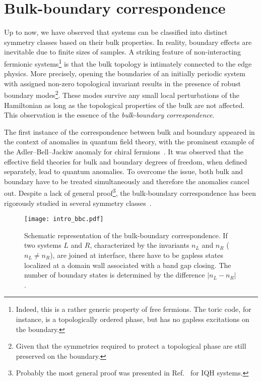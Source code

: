 \section{Bulk-boundary correspondence}
Up to now, we have observed that systems can be classified into distinct symmetry classes based on their bulk properties. In reality, boundary effects are inevitable due to finite sizes of samples. A striking feature of non-interacting fermionic systems\footnote{Indeed, this is a rather generic property of free fermions. The toric code, for instance, is a topologically ordered phase, but has no gapless excitations on the boundary.} is that the bulk topology is intimately connected to the edge physics. More precisely, opening the boundaries of an initially periodic system with assigned non-zero topological invariant results in the presence of robust boundary modes\footnote{Given that the symmetries required to protect a topological phase are still preserved on the boundary.}. These modes survive any small local perturbations of the Hamiltonian as long as the topological properties of the bulk are not affected. This observation is the essence of the \emph{bulk-boundary correspondence}.
 
The first instance of the correspondence between bulk and boundary appeared in the context of anomalies in quantum field theory, with the prominent example of the Adler–Bell–Jackiw anomaly for chiral fermions~\cite{NIELSEN1983389}. It was observed that the effective field theories for bulk and boundary degrees of freedom, when defined separately, lead to quantum anomalies. To overcome the issue, both bulk and boundary have to be treated simultaneously and therefore the anomalies cancel out. Despite a lack of general proof\footnote{Probably the most general proof was presented in Ref.~\cite{PhysRevLett.71.3697} for IQH systems.}, the bulk-boundary correspondence has been rigorously studied in several symmetry classes~\cite{doi:10.1142/S0129055X02001107, doi:10.1143/JPSJ.81.114602, LORING2015383, Graf2013}.

\begin{figure}[H]
\centering
\texttt{[image: intro\_bbc.pdf]}
\caption[Schematic representation of the bulk-boundary correspondence]{Schematic representation of the bulk-boundary correspondence. If two systems $L$ and $R$, characterized by the invariants $n_L$ and $n_R$ ($n_L \neq n_R$), are joined at interface, there have to be gapless states localized at a domain wall associated with a band gap closing. The number of boundary states is determined by the difference $|n_L  - n_R|$.}
\label{fig:bbc}
\end{figure}

